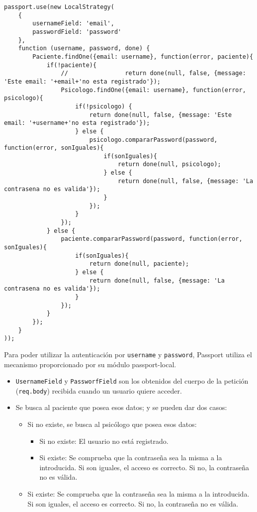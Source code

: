 \medskip
\begin{lstlisting}
passport.use(new LocalStrategy(    
	{
		usernameField: 'email',
		passwordField: 'password'
	},
	function (username, password, done) {   
		Paciente.findOne({email: username}, function(error, paciente){
			if(!paciente){
				//                return done(null, false, {message: 'Este email: '+email+'no esta registrado'});
				Psicologo.findOne({email: username}, function(error, psicologo){
					if(!psicologo) {
						return done(null, false, {message: 'Este email: '+username+'no esta registrado'});
					} else {
						psicologo.compararPassword(password, function(error, sonIguales){
							if(sonIguales){
								return done(null, psicologo);
							} else {
								return done(null, false, {message: 'La contrasena no es valida'});
							}
						});
					}
				});
			} else {
				paciente.compararPassword(password, function(error, sonIguales){
					if(sonIguales){
						return done(null, paciente);
					} else {
						return done(null, false, {message: 'La contrasena no es valida'});
					}
				});
			}
		});
	}
));
\end{lstlisting}


Para poder utilizar la autenticación por \texttt{username}  y \texttt{password}, Passport utiliza el mecanismo proporcionado por su módulo passport-local. 
\begin{itemize}
\item \texttt{UsernameField} y \texttt{PassworfField} son los obtenidos del cuerpo de la petición (\texttt{req.body}) recibida cuando un usuario quiere acceder.
\item Se busca al paciente que posea esos datos; y se pueden dar dos casos:
\begin{itemize}
\item Si no existe, se busca al psicólogo que posea esos datos:
\begin{itemize}
\item Si no existe: El usuario no está registrado.
\item Si existe: Se comprueba que la contraseña sea la misma a la introducida. Si son iguales, el acceso es correcto. Si no, la contraseña no es válida.
\end{itemize}
\item Si existe: Se comprueba que la contraseña sea la misma a la introducida. Si son iguales, el acceso es correcto. Si no, la contraseña no es válida.
\end{itemize}
\end{itemize}


